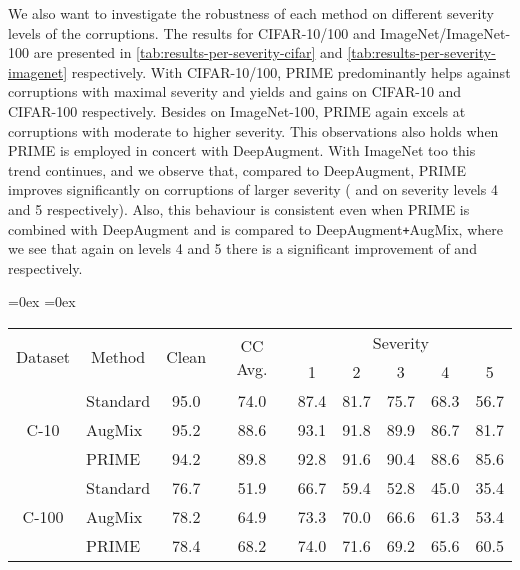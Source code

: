 \documentclass[runningheads]{llncs}
\begin{document}
We also want to investigate the robustness of each method on different severity levels of the corruptions. The results for CIFAR-10/100 and ImageNet/ImageNet-100 are presented in \cref{tab:results-per-severity-cifar} and \cref{tab:results-per-severity-imagenet} respectively. With CIFAR-10/100, PRIME predominantly helps against corruptions with maximal severity and yields  and  gains on CIFAR-10 and CIFAR-100 respectively. Besides on ImageNet-100, PRIME again excels at corruptions with moderate to higher severity. This observations also holds when PRIME is employed in concert with DeepAugment. With ImageNet too this trend continues, and we observe that, compared to DeepAugment, PRIME improves significantly on corruptions of larger severity ( and  on severity levels 4 and 5 respectively). Also, this behaviour is consistent even when PRIME is combined with DeepAugment and is compared to DeepAugment\texttt{+}AugMix, where we see that again on levels 4 and 5 there is a significant improvement of  and  respectively.



\begin{table*}[!ht]
\centering
\footnotesize
\caption{Average accuracy for each corruption severity level of different methods on C-10 and C-100 (ResNet-18).}
\aboverulesep=0ex
\belowrulesep=0ex
\begin{tabular}{clcc|ccccc}
    \toprule
    \multirow{2}{*}{Dataset} & \multicolumn{1}{c}{\multirow{2}{*}{Method}} & \multicolumn{1}{c}{\multirow{2}{*}{Clean}} & \multicolumn{1}{c|}{\multirow{2}{*}{CC Avg.}} & \multicolumn{5}{c}{Severity} \\
& & & & 1 & 2 & 3 & 4 & 5\\
    \midrule
    \multirow{3}{*}{C-10} & Standard & 95.0 & 74.0 & 87.4 & 81.7 & 75.7 & 68.3 & 56.7\\
    & AugMix & 95.2 & 88.6 & 93.1 & 91.8 & 89.9 & 86.7 & 81.7\\
    & PRIME & 94.2 & 89.8 & 92.8 & 91.6 & 90.4 & 88.6 & 85.6\\
    \midrule
    \multirow{3}{*}{C-100}& Standard & 76.7 & 51.9 & 66.7 & 59.4 & 52.8 & 45.0 & 35.4\\
    & AugMix & 78.2 & 64.9 & 73.3 & 70.0 & 66.6 & 61.3 & 53.4\\
    & PRIME & 78.4 & 68.2 & 74.0 & 71.6 & 69.2 & 65.6 & 60.5\\
    \bottomrule
\end{tabular}
\label{tab:results-per-severity-cifar}
\end{table*}
\end{document}

